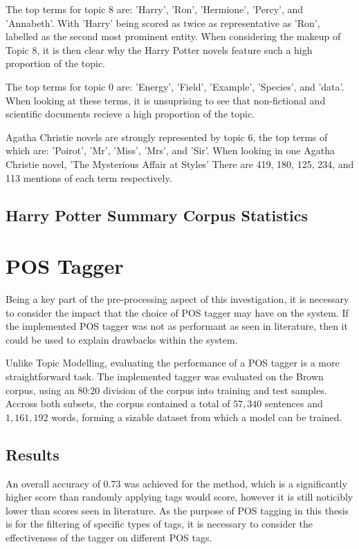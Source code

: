 \documentclass[10pt]{report}
\begin{document}
The top terms for topic 8 are: 'Harry', 'Ron', 'Hermione', 'Percy', and 'Annabeth'. With 'Harry' being scored as twice as representative as 'Ron', labelled as the second most prominent entity. When considering the makeup of Topic 8, it is then clear why the Harry Potter novels feature such a high proportion of the topic.

The top terms for topic 0 are: 'Energy', 'Field', 'Example', 'Species', and 'data'. When looking at these terms, it is unsuprising to see that non-fictional and scientific documents recieve a high proportion of the topic.

Agatha Christie novels are strongly represented by topic 6, the top terms of which are: 'Poirot', 'Mr', 'Miss', 'Mrs', and 'Sir'. When looking in one Agatha Christie novel, 'The Mysterious Affair at Styles' There are 419, 180, 125, 234, and 113 mentions of each term respectively.  


\clearpage
\subsection{Harry Potter Summary Corpus Statistics}



\clearpage
\section{POS Tagger}
Being a key part of the pre-processing aspect of this investigation, it is necessary to consider the impact that the choice of POS tagger may have on the system. If the implemented POS tagger was not as performant as seen in literature, then it could be used to explain drawbacks within the system.

Unlike Topic Modelling, evaluating the performance of a POS tagger is a more straightforward task. The implemented tagger was evaluated on the Brown corpus, using an 80:20 division of the corpus into training and test samples. Accross both subsets, the corpus contained a total of $57,340$ sentences and $1,161,192$ words, forming a sizable dataset from which a model can be trained.


\subsection{Results}

An overall accuracy of 0.73 was achieved for the method, which is a significantly higher score than randomly applying tags would score, however it is still noticibly lower than scores seen in literature. As the purpose of POS tagging in this thesis is for the filtering of specific types of tags, it is necessary to consider the effectiveness of the tagger on different POS tags.
\end{document}
